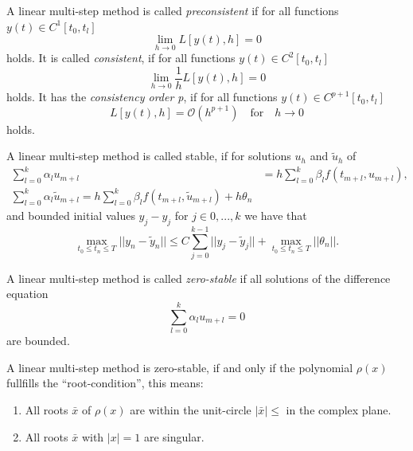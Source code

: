	\begin{definition}
		A linear multi-step method is called \emph{preconsistent} if for all functions $y(t) \in C^1[t_0,t_l]$
		\begin{displaymath}
			\lim\limits_{h \to 0} L[y(t),h]=0
		\end{displaymath}
		holds. It is called \emph{consistent}, if for all functions $y(t) \in C^2[t_0,t_l]$
		\begin{displaymath}
			\lim\limits_{h \to 0} \frac{1}{h} L[y(t),h] = 0
		\end{displaymath}
		holds. It has the \emph{consistency order p}, if for all functions $y(t) \in C^{p+1}[t_0, t_l]$
		\begin{displaymath}
			L[y(t),h] = \mathcal{O}(h^{p+1}) \quad \text{for} \quad h \to 0
		\end{displaymath}
		holds.
	\end{definition}
	
	\begin{definition} \label{discrete stability LMSM}
		A linear multi-step method is called stable, if for solutions $u_h$ and $\tilde{u}_h$ of
		\begin{align}
			\sum_{l=0}^{k} \alpha_l u_{m+l} &= h \sum_{l=0}^{k} \beta_l f(t_{m+l}, u_{m+l}), \\
			\sum_{l=0}^{k} \alpha_l \tilde{u}_{m+l} = h \sum_{l=0}^{k} \beta_l f(t_{m+l}, \tilde{u}_{m+l}) + h\theta_n
		\end{align} 
		and bounded initial values $y_j - y_j$ for $j \in {0,...,k}$ we have that
		\begin{displaymath}
			\max_{t_0 \leq t_n \leq T} ||y_n - \tilde{y}_n|| \leq C \sum_{j=0}^{k-1} ||y_j - \tilde{y}_j|| + \max_{t_0 \leq t_n \leq T} ||\theta_n||.
		\end{displaymath}
	\end{definition}
	
	\begin{definition}
		A linear multi-step method is called \emph{zero-stable} if all solutions of the difference equation
		\begin{displaymath}
			\sum_{l=0}^{k} \alpha_l u_{m+l} = 0
		\end{displaymath}
		are bounded.
	\end{definition}
	
	\begin{theorem}
		A linear multi-step method is zero-stable, if and only if the polynomial $\rho(x)$ fullfills the ``root-condition'', this means:
		\begin{enumerate}
			\item All roots $\bar{x}$ of $\rho(x)$ are within the unit-circle $|\bar{x}| \leq$ in the complex plane.
			\item All roots $\bar{x}$ with $|x| = 1$ are singular.
		\end{enumerate}
	\end{theorem}
	

